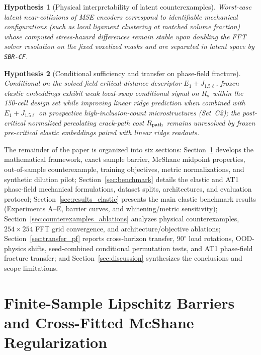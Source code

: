 \documentclass[preprint,11pt,a4paper]{elsarticle}
\newtheorem{hypothesis}{Hypothesis}
\begin{document}
\begin{hypothesis}[Physical interpretability of latent counterexamples]
\label{hyp:mech}
Worst-case latent near-collisions of MSE encoders correspond to identifiable mechanical configurations (such as local ligament clustering at matched volume fraction) whose computed stress-hazard differences remain stable upon doubling the FFT solver resolution on the fixed voxelized masks and are separated in latent space by \texttt{SBR-CF}.
\end{hypothesis}

\begin{hypothesis}[Conditional sufficiency and transfer on phase-field fracture]
\label{hyp:pf}
Conditional on the solved-field critical-distance descriptor $E_1+J_{1.5\ell}$, frozen elastic embeddings exhibit weak local-swap conditional signal on $R_\sigma$ within the 150-cell design set while improving linear ridge prediction when combined with $E_1+J_{1.5\ell}$ on prospective high-inclusion-count microstructures (Set~C2); the post-critical normalized percolating crack-path cost $R_{\rm path}$ remains unresolved by frozen pre-critical elastic embeddings paired with linear ridge readouts.
\end{hypothesis}

The remainder of the paper is organized into six sections: Section~\ref{sec:theory} develops the mathematical framework, exact sample barrier, McShane midpoint properties, out-of-sample counterexample, training objectives, metric normalizations, and synthetic dilution pilot; Section~\ref{sec:benchmark} details the elastic and AT1 phase-field mechanical formulations, dataset splits, architectures, and evaluation protocol; Section~\ref{sec:results_elastic} presents the main elastic benchmark results (Experiments A--E, barrier curves, and whitening/metric sensitivity); Section~\ref{sec:counterexamples_ablations} analyzes physical counterexamples, $254\times 254$ FFT grid convergence, and architecture/objective ablations; Section~\ref{sec:transfer_pf} reports cross-horizon transfer, $90^\circ$ load rotations, OOD-physics shifts, seed-combined conditional permutation tests, and AT1 phase-field fracture transfer; and Section~\ref{sec:discussion} synthesizes the conclusions and scope limitations.

\section{Finite-Sample Lipschitz Barriers and Cross-Fitted McShane Regularization}
\label{sec:theory}
\end{document}
